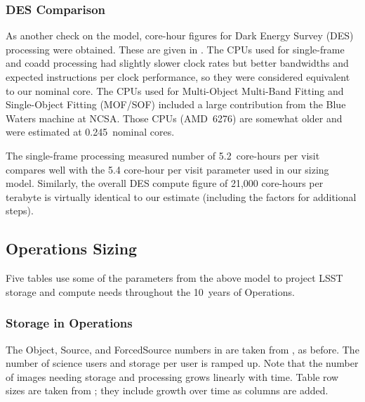 

\subsubsection{DES Comparison}

As another check on the model, core-hour figures for Dark Energy Survey (DES) processing were obtained.
These are given in .
The CPUs used for single-frame and coadd processing had slightly slower clock rates but better bandwidths and expected instructions per clock performance, so they were considered equivalent to our nominal core.
The CPUs used for Multi-Object Multi-Band Fitting and Single-Object Fitting (MOF/SOF) included a large contribution from the Blue Waters machine at NCSA.
Those CPUs (AMD~6276) are somewhat older and were estimated at 0.245~nominal cores.

The single-frame processing measured number of 5.2~core-hours per visit compares well with the 5.4 core-hour per visit parameter used in our sizing model.
Similarly, the overall DES compute figure of 21,000 core-hours per terabyte is virtually identical to our estimate (including the factors for additional steps).




\subsection{Operations Sizing}

Five tables use some of the parameters from the above model to project LSST storage and compute needs throughout the 10~years of Operations.

\subsubsection{Storage in Operations}

\afterpage{
  \clearpage
  \begin{landscape}
      
      
  \end{landscape}
  \clearpage
}

The Object, Source, and ForcedSource numbers in  are taken from , as before.
The number of science users and storage per user is ramped up.
Note that the number of images needing storage and processing grows linearly with time.
Table row sizes are taken from ; they include growth over time as columns are added.

